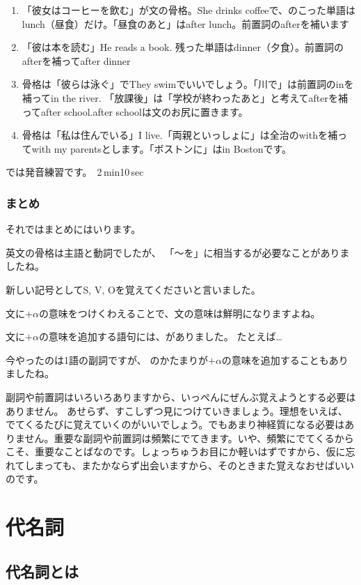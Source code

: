 \documentclass[book,jafontscale=0.9247]{jlreq}
\begin{document}
\begin{enumerate}
 \item 「彼女はコーヒーを飲む」が文の骨格。She drinks coffeeで、のこった単語はlunch（昼食）だけ。「昼食のあと」はafter lunch。前置詞のafterを補います
 \item 「彼は本を読む」He reads a book. 残った単語はdinner（夕食）。前置詞のafterを補ってafter dinner
 \item 骨格は「彼らは泳ぐ」でThey swimでいいでしょう。「川で」は前置詞のinを補ってin the river. 「放課後」は「学校が終わったあと」と考えてafterを補ってafter school.after schoolは文のお尻に置きます。
 \item 骨格は「私は住んでいる」I live.「両親といっしょに」は全治のwithを補ってwith my parentsとします。「ボストンに」はin Bostonです。
\end{enumerate}

では発音練習です。
\faVolumeUp\,2\,min10\,sec

\subsection{まとめ}

それではまとめにはいります。

英文の骨格は主語と動詞でしたが、
「～を」に相当するが必要なことがありましたね。

新しい記号としてS, V, Oを覚えてくださいと言いました。

文に$+\alpha$の意味をつけくわえることで、文の意味は鮮明になりますよね。

文に$+\alpha$の意味を追加する語句には、がありました。
たとえば\ldots

今やったのは1語の副詞ですが、
のかたまりが$+\alpha$の意味を追加することもありましたね。

副詞や前置詞はいろいろありますから、いっぺんにぜんぶ覚えようとする必要はありません。
あせらず、すこしずつ見につけていきましょう。理想をいえば、でてくるたびに覚えていくのがいいでしょう。でもあまり神経質になる必要はありません。重要な副詞や前置詞は頻繁にでてきます。いや、頻繁にでてくるからこそ、重要なことばなのです。しょっちゅうお目にか軽いはずですから、仮に忘れてしまっても、またかならず出会いますから、そのときまた覚えなおせばいいのです。
\chapter{代名詞}

\section{代名詞とは}
\end{document}
